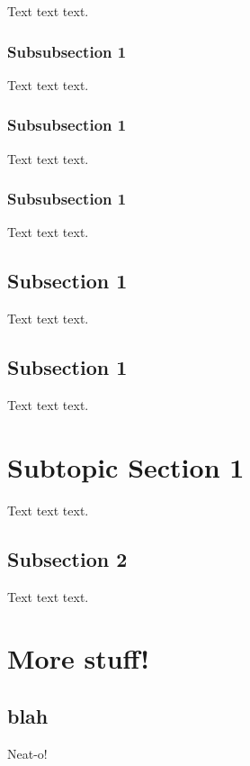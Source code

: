 \documentclass[twoside]{amsart}
\theoremstyle{plain} %
\theoremstyle{definition}
\theoremstyle{remark}
\begin{document}
	Text text text.
	
	\subsubsection{Subsubsection 1}
	
	Text text text.
	
	\subsubsection{Subsubsection 1}
	
	Text text text.
	
	\subsubsection{Subsubsection 1}
	
	Text text text.
	
	\subsection{Subsection 1}
	
	Text text text.
	
	\subsection{Subsection 1}
	
	Text text text.
	
	\section{Subtopic Section 1}
	
	Text text text.
	
	\subsection{Subsection 2}
	
	Text text text.
	
	\clearpage 
	
	\section{More stuff!}
	
	\subsection{blah}
	
	Neat-o!
	
\end{document}
